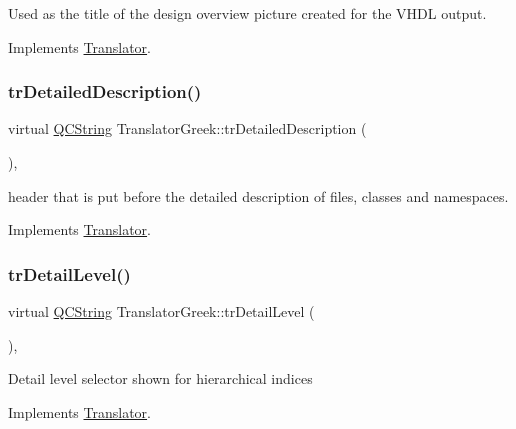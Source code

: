 Used as the title of the design overview picture created for the V\+H\+DL output. 

Implements \mbox{\hyperlink{class_translator}{Translator}}.

\mbox{\label{class_translator_greek_ac8ebc41faf7de8de1d3c8b0f67ec50c6}} 
\subsubsection{\texorpdfstring{trDetailedDescription()}{trDetailedDescription()}}
{\footnotesize\ttfamily virtual \mbox{\hyperlink{class_q_c_string}{Q\+C\+String}} Translator\+Greek\+::tr\+Detailed\+Description (\begin{DoxyParamCaption}{ }\end{DoxyParamCaption})\hspace{0.3cm}{\ttfamily [inline]}, {\ttfamily [virtual]}}

header that is put before the detailed description of files, classes and namespaces. 

Implements \mbox{\hyperlink{class_translator}{Translator}}.

\mbox{\label{class_translator_greek_a454dd6d523be69b77963252a6037dca2}} 
\subsubsection{\texorpdfstring{trDetailLevel()}{trDetailLevel()}}
{\footnotesize\ttfamily virtual \mbox{\hyperlink{class_q_c_string}{Q\+C\+String}} Translator\+Greek\+::tr\+Detail\+Level (\begin{DoxyParamCaption}{ }\end{DoxyParamCaption})\hspace{0.3cm}{\ttfamily [inline]}, {\ttfamily [virtual]}}

Detail level selector shown for hierarchical indices 

Implements \mbox{\hyperlink{class_translator}{Translator}}.

\mbox{\label{class_translator_greek_ab1793dde0ab01b6db9ad15658de398f5}} 
